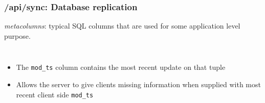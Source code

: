 \documentclass[]{beamer}
\newcommand{\pad}{\vbox to 20pt{}}
\begin{document}
\begin{frame}
\frametitle{/api/sync: Database replication}
\textit{metacolumns}: typical SQL columns that are used for some application level purpose.

\begin{columns}[c]
\column{2in}
\column{2in}
\small
\begin{itemize}
\item The \texttt{mod\_ts} column contains the most recent update on that tuple
\item Allows the server to give clients missing information when supplied with most recent client side \texttt{mod\_ts}
\end{itemize}
\end{columns}
\end{frame}









%
%
%
%
%
%
%
\end{document}
